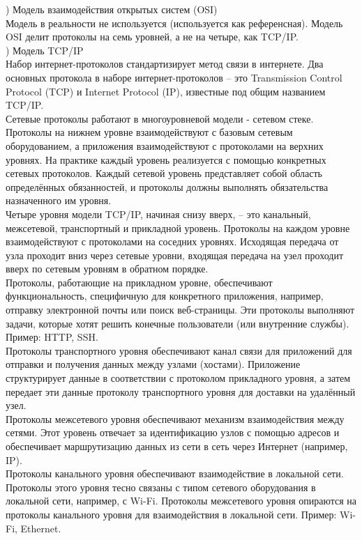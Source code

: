 ) Модель взаимодействия открытых систем (OSI) \\
Модель в реальности не используется (используется как референсная). Модель OSI делит протоколы на
семь уровней, а не на четыре, как TCP/IP. \\

) Модель TCP/IP \\
Набор интернет-протоколов стандартизирует метод связи в интернете. Два основных протокола в наборе интернет-протоколов – это Transmission Control Protocol (TCP) и Internet Protocol (IP), известные под общим названием TCP/IP. \\
Сетевые протоколы работают в многоуровневой модели - сетевом стеке. Протоколы на нижнем уровне взаимодействуют с базовым сетевым оборудованием, а приложения взаимодействуют с протоколами на верхних уровнях. На практике каждый уровень реализуется с помощью конкретных сетевых протоколов. Каждый сетевой уровень представляет собой область определённых обязанностей, и протоколы должны выполнять обязательства назначенного им уровня. \\
Четыре уровня модели TCP/IP, начиная снизу вверх, – это канальный, межсетевой, транспортный и прикладной уровень. Протоколы на каждом уровне взаимодействуют с протоколами на соседних уровнях. Исходящая передача от узла проходит вниз через сетевые уровни, входящая передача на узел проходит вверх по сетевым уровням в обратном порядке. \\
Протоколы, работающие на прикладном уровне, обеспечивают функциональность, специфичную для конкретного приложения, например, отправку электронной почты или поиск веб-страницы. Эти протоколы выполняют задачи, которые хотят решить конечные пользователи (или внутренние службы). Пример: HTTP, SSH. \\
Протоколы транспортного уровня обеспечивают канал связи для приложений для отправки и получения данных между узлами (хостами). Приложение структурирует данные в соответствии с протоколом прикладного уровня, а затем передает эти данные протоколу транспортного уровня для доставки на удалённый узел. \\
Протоколы межсетевого уровня обеспечивают механизм взаимодействия между сетями. Этот уровень отвечает за идентификацию узлов с помощью адресов и обеспечивает маршрутизацию данных из сети в сеть через Интернет (например, IP). \\
Протоколы канального уровня обеспечивают взаимодействие в локальной сети. Протоколы этого уровня тесно связаны с типом сетевого оборудования в локальной сети, например, с Wi-Fi. Протоколы межсетевого уровня опираются на протоколы канального уровня для взаимодействия в локальной сети. Пример:  Wi-Fi, Ethernet. \\

